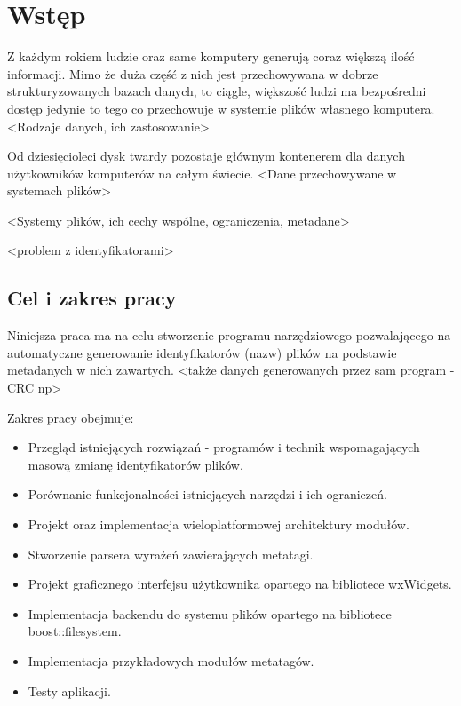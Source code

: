 \chapter{Wstęp}

\par
Z każdym rokiem ludzie oraz same komputery generują coraz większą ilość informacji.
Mimo że duża część z nich jest przechowywana w dobrze strukturyzowanych bazach danych, to ciągle, większość ludzi ma bezpośredni dostęp jedynie to tego co przechowuje w systemie plików własnego komputera.
<Rodzaje danych, ich zastosowanie>

\par
Od dziesięcioleci dysk twardy pozostaje głównym kontenerem dla danych użytkowników komputerów na całym świecie.
<Dane przechowywane w systemach plików>

\par
<Systemy plików, ich cechy wspólne, ograniczenia, metadane>

\par
<problem z identyfikatorami>

\clearpage

\section{Cel i zakres pracy}
\par
Niniejsza praca ma na celu stworzenie programu narzędziowego pozwalającego na automatyczne generowanie identyfikatorów (nazw) plików na podstawie metadanych w nich zawartych. <także danych generowanych przez sam program - CRC np>

\par
Zakres pracy obejmuje:
\begin{itemize}
\item Przegląd istniejących rozwiązań - programów i technik wspomagających masową zmianę identyfikatorów plików.
\item Porównanie funkcjonalności istniejących narzędzi i ich ograniczeń.
\item Projekt oraz implementacja wieloplatformowej architektury modułów.
\item Stworzenie parsera wyrażeń zawierających metatagi.
\item Projekt graficznego interfejsu użytkownika opartego na bibliotece wxWidgets.
\item Implementacja backendu do systemu plików opartego na bibliotece boost::filesystem.
\item Implementacja przykładowych modułów metatagów.
\item Testy aplikacji.
\end{itemize}

